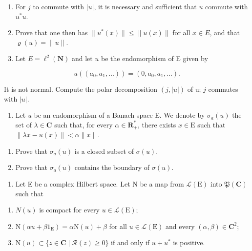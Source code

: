 \begin{enumerate}
\def\labelenumi{\alph{enumi})}
\item
  For \(j\) to commute with \(|u|\), it is necessary and sufficient that \(u\) commute with \(u^{*}u\).
\item
  Prove that one then has \(\|u^{*}(x)\|\leqslant\|u(x)\|\) for all \(x\in E\), and that \(\varrho(u)=\|u\|\).
\item
  Let \(E = \ell^{2}(\mathbf{N})\) and let \(u\) be the endomorphism of E given by
\end{enumerate}

\[
u ((a _ {0}, a _ {1}, \dots)) = (0, a _ {0}, a _ {1}, \dots).
\]

It is not normal. Compute the polar decomposition \((j, |u|)\) of u; \(j\) commutes with \(|u|\).

\begin{enumerate}
\def\labelenumi{\arabic{enumi})}
\setcounter{enumi}{11}
\tightlist
\item
  Let \(u\) be an endomorphism of a Banach space E. We denote by \(\sigma_{a}(u)\) the set of \(\lambda\in\mathbf{C}\) such that, for every \(\alpha\in\mathbf{R}_{+}^{*}\), there exists \(x\in\mathrm{E}\) such that \(\|\lambda x-u(x)\|<\alpha\|x\|\).
\end{enumerate}

\begin{enumerate}
\def\labelenumi{\alph{enumi})}
\item
  Prove that \(\sigma_{a}(u)\) is a closed subset of \(\sigma(u)\).
\item
  Prove that \(\sigma_{a}(u)\) contains the boundary of \(\sigma(u)\).
\end{enumerate}

\begin{enumerate}
\def\labelenumi{\arabic{enumi})}
\setcounter{enumi}{12}
\tightlist
\item
  Let E be a complex Hilbert space. Let N be a map from \(\mathcal{L}(\mathrm{E})\) into \(\mathfrak{P}(\mathbf{C})\) such that
\end{enumerate}

\begin{enumerate}
\def\labelenumi{\alph{enumi})}
\item
  \(N(u)\) is compact for every \(u \in \mathcal{L}(\mathrm{E})\);
\item
  \(\mathrm{N}(\alpha u + \beta 1_{\mathrm{E}}) = \alpha \mathrm{N}(u) + \beta\) for all \(u \in \mathcal{L}(\mathrm{E})\) and every \((\alpha, \beta) \in \mathbf{C}^{2}\);
\item
  \(\mathrm{N}(u)\subset\{z\in\mathbf{C}\mid\mathcal{R}(z)\geqslant0\}\) if and only if \(u+u^{*}\) is positive.
\end{enumerate}

